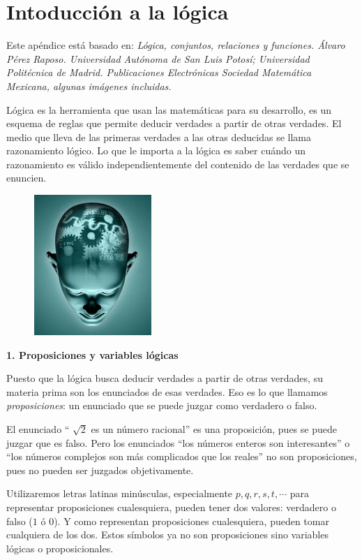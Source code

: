 	
	

\chapter{Intoducción a la lógica}
\label{ap:logica}

Este apéndice está basado en: \emph{Lógica, conjuntos, relaciones y funciones.   Álvaro Pérez Raposo.     Universidad Autónoma de San Luis Potosí; Universidad Politécnica de Madrid. Publicaciones Electrónicas Sociedad Matemática Mexicana, algunas imágenes incluidas.}

\begin{multicols}{2}
Lógica es la herramienta que usan las matemáticas para su desarrollo, es un esquema de reglas que permite deducir verdades a partir de otras verdades. El medio que lleva de las primeras verdades a las otras deducidas se llama razonamiento lógico. Lo que le importa a la lógica es saber cuándo un razonamiento es válido independientemente del contenido de las verdades que se enuncien.
	\begin{figure}[H] 
		\centering
		\includegraphics[width=0.25
		\textwidth]{imagenes/apendices/APENDICESIM11.png}
	\end{figure}
\end{multicols}

\textbf{1. Proposiciones y variables lógicas}

Puesto que la lógica busca deducir verdades a partir de otras verdades, su materia prima son los enunciados de esas verdades. Eso es lo que llamamos \emph{proposiciones}: un enunciado que se puede juzgar como verdadero o falso.

El enunciado “  $\sqrt{2}$ es un número racional” es una proposición, pues se puede juzgar que es falso. Pero los enunciados “los números enteros son interesantes” o “los números complejos son más complicados que los reales” no son proposiciones, pues no pueden ser juzgados objetivamente.

Utilizaremos letras latinas minúsculas, especialmente $p,q,r,s,t, \cdots $ para representar proposiciones cualesquiera, pueden tener dos valores: verdadero o falso ($1$ ó $0$). Y como representan proposiciones cualesquiera, pueden tomar cualquiera de los dos. Estos símbolos ya no son proposiciones sino variables lógicas o proposicionales.

